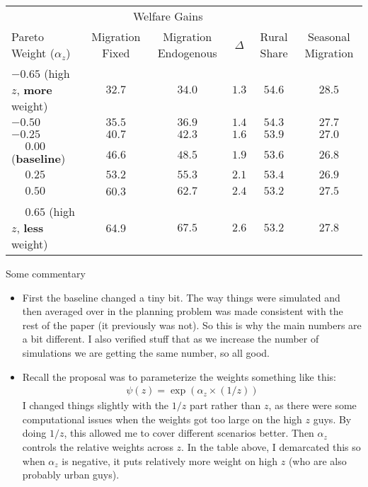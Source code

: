\documentclass[12pt,pdftex]{article}
\begin{document}
\begin{onehalfspacing}
\begin{table}[h]
\begin{center}
\begin{tabular}{l c c c c c}
\hline
\hline
& \multicolumn{3}{c}{Welfare Gains} & & \\
Pareto Weight ($\alpha_z$)		& Migration Fixed  & Migration Endogenous & $\Delta$ & Rural Share & Seasonal Migration \\
\cmidrule(lr){2-2} \cmidrule(lr){3-3} \cmidrule(lr){4-4} \cmidrule(lr){5-5} \cmidrule(lr){6-6}
$-0.65$ (high $z$, \textbf{more} weight)     & $32.7$  & $34.0 $  & $1.3$ & $54.6$& $28.5$\\
$-0.50$                                      & $35.5$  & $36.9$ & $1.4$ & $54.3$& $27.7$\\
$-0.25$                                      & $40.7$  & $42.3$ & $1.6$ & $53.9$ & $27.0$\\
$\phantom{-}0.00$ (\textbf{baseline})        & $46.6$  & $48.5$ & $1.9$ & $53.6$ & $26.8$\\
$\phantom{-}0.25$                            &  $53.2$ & $55.3$ & $2.1$ & $53.4$ & $26.9$\\
$\phantom{-}0.50$                            & 60.3  & $62.7$ & $2.4$ & $53.2$ & $27.5$\\
$\phantom{-}0.65$ (high $z$, \textbf{less} weight) &64.9 & $67.5$ & $2.6$ & $53.2$ & $27.8$\\
\hline
\end{tabular}
\parbox[c]{6.9in}{%
{\footnotesize  \vspace{0.1cm} }
}
\end{center}
\end{table}

Some commentary
\begin{itemize}
\item First the baseline changed a tiny bit. The way things were simulated and then averaged over in the planning problem was made consistent with the rest of the paper (it previously was not). So this is why the main numbers are a bit different. I also verified stuff that as we increase the number of simulations we are getting the same number, so all good.

\item Recall the proposal was to parameterize the weights something like this:
\begin{align}
\psi(z) = \exp(\alpha_z \times (1/z) )
\end{align}
I changed things slightly with the $1/z$ part rather than $z$, as there were some computational issues when the weights got too large on the high $z$ guys. By doing $1/z$, this allowed me to cover different scenarios better. Then $\alpha_z$ controls the relative weights across $z$. In the table above, I demarcated this so when $\alpha_z$ is negative, it puts relatively more weight on high $z$ (who are also probably urban guys).


\end{itemize}
\end{onehalfspacing}
\end{document}
